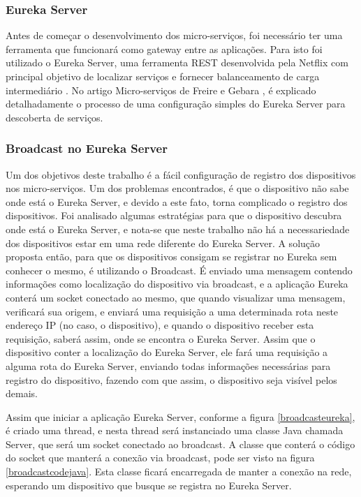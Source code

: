 \documentclass[journal]{IEEEtran}
\begin{document}
\subsubsection{Eureka Server}

Antes de começar o desenvolvimento dos micro-serviços, foi necessário ter uma ferramenta que funcionará como gateway entre as aplicações. Para isto foi utilizado o Eureka Server, uma ferramenta REST desenvolvida pela Netflix com principal objetivo de localizar serviços e fornecer balanceamento de carga intermediário \cite{eurekanetflix}. No artigo Micro-serviços de Freire e Gebara \cite[p.~6]{freiregebaramicroservico}, é explicado detalhadamente o processo de uma configuração simples do Eureka Server para descoberta de serviços.

\subsubsection{Broadcast no Eureka Server}

Um dos objetivos deste trabalho é a fácil configuração de registro dos dispositivos nos micro-serviços. Um dos problemas encontrados, é que o dispositivo não sabe onde está o Eureka Server, e devido a este fato, torna complicado o registro dos dispositivos. Foi analisado algumas estratégias para que o dispositivo descubra onde está o Eureka Server, e nota-se que neste trabalho não há a necessariedade dos dispositivos estar em uma rede diferente do Eureka Server. A solução proposta então, para que os dispositivos consigam se registrar no Eureka sem conhecer o mesmo, é utilizando o Broadcast. É enviado uma mensagem contendo informações como localização do dispositivo via broadcast, e a aplicação Eureka conterá um socket conectado ao mesmo, que quando visualizar uma mensagem, verificará sua origem, e enviará uma requisição a uma determinada rota neste endereço IP (no caso, o dispositivo), e quando o dispositivo receber esta requisição, saberá assim, onde se encontra o Eureka Server. Assim que o dispositivo conter a localização do Eureka Server, ele fará uma requisição a alguma rota do Eureka Server, enviando todas informações necessárias para registro do dispositivo, fazendo com que assim, o dispositivo seja visível pelos demais.

Assim que iniciar a aplicação Eureka Server, conforme a figura \ref{broadcasteureka}, é criado uma thread, e nesta thread será instanciado uma classe Java chamada Server, que será um socket conectado ao broadcast. A classe que conterá o código do socket que manterá a conexão via broadcast, pode ser visto na figura \ref{broadcastcodejava}. Esta classe ficará encarregada de manter a conexão na rede, esperando um dispositivo que busque se registra no Eureka Server.
\end{document}
